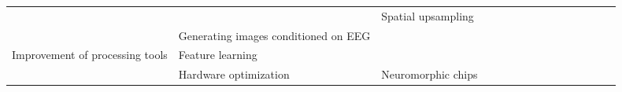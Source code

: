 \begin{tabular}{p{1.5cm}p{1.5cm}p{1.5cm}p{1.5cm}p{0.6cm}p{0.6cm}p{0.6cm}p{0.6cm}p{0.6cm}p{0.6cm}p{0.6cm}p{0.6cm}p{0.6cm}p{0.6cm}p{0.6cm}}
                                &                 & Spatial upsampling &   &                                                             &                                                                                                                             &                                                                        &                  &                                      &                                                            &    \cite{Corley2018} &                       &                                 &                         &                                                                      \\
                                & Generating images conditioned on EEG &   &   &                                                             &                                                                                                                             &                                                                        &                  &                                      &                                                            &       \cite{Lee2018} &                       &              \cite{Palazzo2017} &                         &                                                                      \\
Improvement of processing tools & Feature learning &   &   &                          \cite{Wen2018, Stober2015, Li2015} &                                                                                                        \cite{Bashivan2016a} &                                                                        &                  &                                      &                                                            &                      &                       &                                 &                         &                                                                      \\
                                & Hardware optimization & Neuromorphic chips &   &                                                             &                                                                                                            \cite{Nurse2016} &                                                                        &                  &                                      &                                                            &                      &      \cite{Yepes2017} &                                 &                         &                                                                      \\

\end{tabular}
